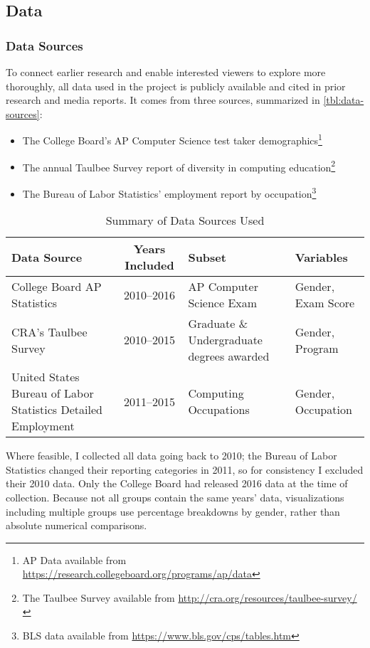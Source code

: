 \subsection{Data}\label{sec:data}
\subsubsection{Data Sources}
To connect earlier research and enable interested viewers to explore more thoroughly, all data used in the project is publicly available and cited in prior research and media reports.
It comes from three sources, summarized in \autoref{tbl:data-sources}:
\begin{itemize}
  \item The College Board's AP Computer Science test taker demographics\footnote{AP Data available from \url{https://research.collegeboard.org/programs/ap/data}}
  \item The annual Taulbee Survey report of diversity in computing education\footnote{The Taulbee Survey available from \url{http://cra.org/resources/taulbee-survey/}}
  \item The Bureau of Labor Statistics' employment report by occupation\footnote{BLS data available from \url{https://www.bls.gov/cps/tables.htm}}
\end{itemize}

\begin{table}
  \begin{tabular}{L{3cm}cL{4.5cm}l} \hline
    \textbf{Data Source} & \textbf{Years Included} & \textbf{Subset} & \textbf{Variables} \\ \hline
    College Board AP Statistics & 2010--2016 & AP Computer Science Exam & Gender, Exam Score \\
    CRA's Taulbee Survey & 2010--2015 & Graduate \& Undergraduate degrees awarded & Gender, Program \\
    United States Bureau of Labor Statistics Detailed Employment & 2011--2015 & Computing Occupations & Gender, Occupation \\ \hline
  \end{tabular}
  \caption{Summary of Data Sources Used}\label{tbl:data-sources}
\end{table}

Where feasible, I collected all data going back to 2010; the Bureau of Labor Statistics changed their reporting categories in 2011, so for consistency I excluded their 2010 data. Only the College Board had released 2016 data at the time of collection. Because not all groups contain the same years' data, visualizations including multiple groups use percentage breakdowns by gender, rather than absolute numerical comparisons.

